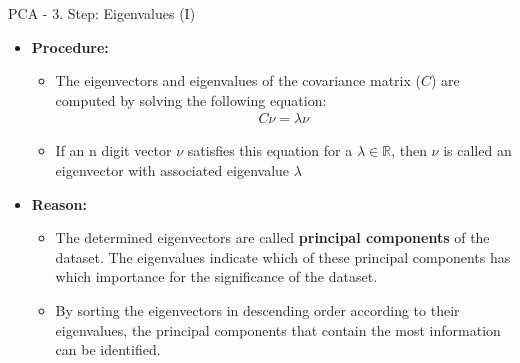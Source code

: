 \begin{frame}{PCA - 3. Step: Eigenvalues (I)}
	\begin{itemize}
		\item \textbf{Procedure:}
		      \begin{itemize}
			      \item The eigenvectors and eigenvalues of the covariance matrix
			            ($C$) are computed by solving the following equation:
			            \begin{align*}
				            C \nu = \lambda \nu
			            \end{align*}
			      \item If an n digit vector $\nu$ satisfies this equation for a
			            $\lambda \in \mathbb{R}$, then $\nu$ is called an eigenvector with
			            associated eigenvalue $\lambda$
		      \end{itemize}
		\item \textbf{Reason:}
		      \begin{itemize}
			      \item The determined eigenvectors are called \textbf{principal
				            components} of the dataset. The eigenvalues indicate which of these
			            principal components has which importance for the significance of
			            the dataset.
			      \item By sorting the eigenvectors in descending order according to
			            their eigenvalues, the principal components that contain the most
			            information can be identified.
		      \end{itemize}
	\end{itemize}
\end{frame}

